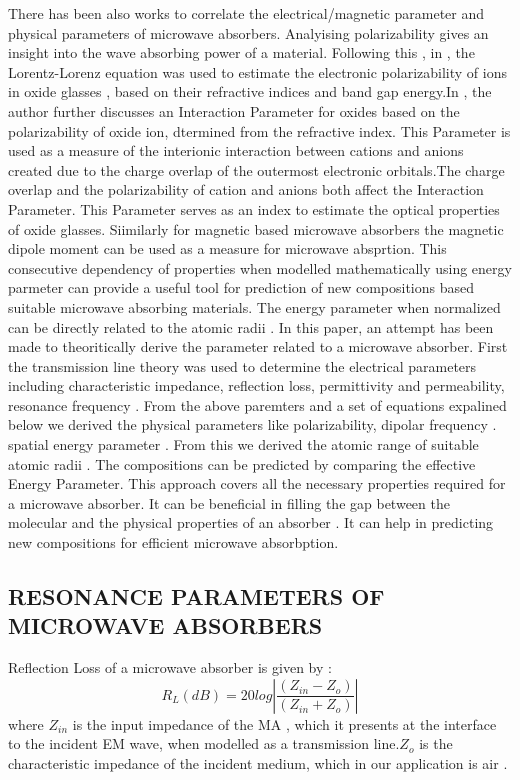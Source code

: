 \documentclass[journal]{IEEEtran}
\begin{document}
There has been also works to correlate the electrical/magnetic parameter and physical parameters of microwave absorbers. Analyising polarizability gives an insight into the wave absorbing power of a material. Following this , in \cite{Erbium} , the Lorentz-Lorenz equation was used to estimate  the electronic polarizability of ions in oxide glasses , based on their refractive indices and band gap energy.In \cite{dimitrov1999effect} , the author further discusses an Interaction Parameter for oxides based  on the polarizability of oxide ion, dtermined from the refractive index. This Parameter is used as a measure of the interionic interaction between cations and anions created due to the charge overlap of the outermost electronic orbitals.The charge overlap and the polarizability of cation and anions both affect the Interaction Parameter. This Parameter serves as an index to estimate the optical  properties of oxide glasses. Siimilarly for magnetic based microwave absorbers the magnetic dipole moment can be used as a measure for microwave absprtion.  This consecutive dependency of  properties when modelled mathematically using energy parmeter can provide a useful tool for prediction of new compositions based suitable microwave absorbing materials. The energy parameter when normalized can be directly related to the atomic radii \cite{korablev2018calculations}.
In this paper, an attempt has been made to theoritically derive the parameter related to a microwave absorber. First the transmission line theory was used to determine the electrical parameters including characteristic impedance, reflection loss, permittivity and permeability, resonance frequency . From the above paremters and a set of equations expalined below we derived  the physical parameters like polarizability, dipolar frequency . spatial energy parameter . From this we derived   the atomic range of suitable atomic radii . The compositions can be predicted by comparing the effective Energy Parameter. This approach covers all the necessary  properties required for a microwave absorber. It can be beneficial in filling the gap between the molecular and the physical properties of an absorber . It can help in predicting new compositions for efficient microwave absorbption.

\subsection{RESONANCE PARAMETERS OF MICROWAVE ABSORBERS}
Reflection Loss of a microwave absorber is given by :
\begin{equation}
 R_L(dB) = 20log|\frac{(Z_{in} - Z_o)}{(Z_{in} + Z_o)}| \label{eq1}
\end{equation}
where $ Z_{in} $  is the input impedance of the MA , which it presents at the interface to the incident EM wave, when modelled as a transmission line.$ Z_o$ is the characteristic impedance of the incident medium, which in our application is air \cite{r1} \cite{r2}.
\end{document}

